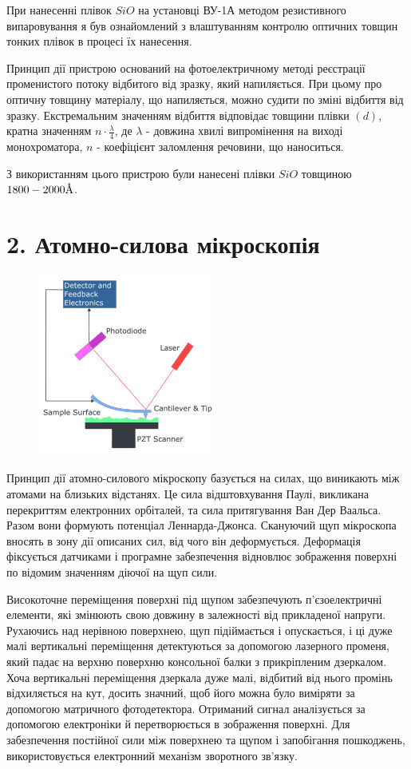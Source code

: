 \documentclass[a4paper, 14pt]{extarticle}
\begin{document}
При нанесенні плівок $SiO$ на установці ВУ-1А методом резистивного випаровування я був ознайомлений з влаштуванням контролю оптичних товщин тонких плівок в процесі їх нанесення.

Принцип дії пристрою оснований на фотоелектричному методі реєстрації променистого потоку відбитого від зразку, який напиляється. При цьому про оптичну товщину матеріалу, що напиляється, можно судити по зміні відбиття від зразку. Екстремальним значенням відбиття відповідає товщини плівки $(d)$, кратна значенням $n \cdot \frac{\lambda}{4}$, де $\lambda$ - довжина хвилі випромінення на виході монохроматора, $n$ - коефіцієнт заломлення речовини, що наноситься.

З використанням цього пристрою були нанесені плівки $SiO$ товщиною $1800-2000 \mbox{\normalfont\AA}$.

\newpage

\section{2. Атомно-силова мікроскопія}
\begin{center}
  \begin{figure}[H]
    \includegraphics[scale=.8]{./img/afm.jpg}
  \end{figure}
\end{center}

Принцип дії атомно-силового мікроскопу базується на силах, що виникають між атомами на близьких відстанях. Це сила відштовхування Паулі, викликана перекриттям електронних орбіталей, та сила притягування Ван Дер Ваальса. Разом вони формують потенціал Леннарда-Джонса. Скануючий щуп мікроскопа вносять в зону дії описаних сил, від чого він деформується. Деформація фіксується датчиками і програмне забезпечення відновлює зображення поверхні по відомим значенням діючої на щуп сили.

Високоточне переміщення поверхні під щупом забезпечують п'єзоелектричні елементи, які змінюють свою довжину в залежності від прикладеної напруги. Рухаючись над нерівною поверхнею, щуп підіймається і опускається, і ці дуже малі вертикальні переміщення детектуються за допомогою лазерного променя, який падає на верхню поверхню консольної балки з прикріпленим дзеркалом. Хоча вертикальні переміщення дзеркала дуже малі, відбитий від нього промінь відхиляється на кут, досить значний, щоб його можна було виміряти за допомогою матричного фотодетектора. Отриманий сигнал аналізується за допомогою електроніки й перетворюється в зображення поверхні. Для забезпечення постійної сили між поверхнею та щупом і запобігання пошкоджень, використовується електронний механізм зворотного зв'язку.
\end{document}
